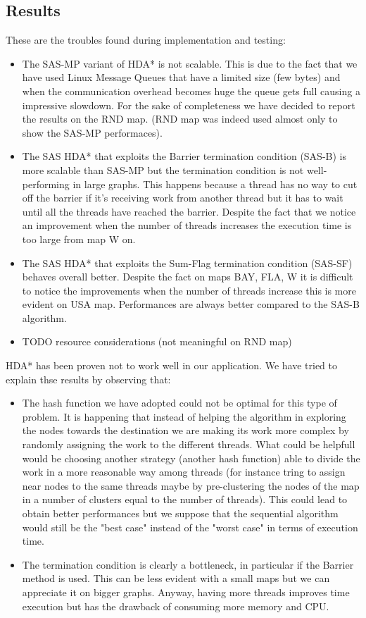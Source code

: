 \documentclass[twocolumn, switch]{article} %
\begin{document}
\subsection{Results}
These are the troubles found during implementation and testing:
\begin{itemize}
  \item The SAS-MP variant of HDA* is not scalable. This is due to the fact that we
        have used Linux Message Queues that have a limited size (few bytes) and when
        the communication overhead becomes huge the queue gets full causing a impressive
        slowdown. For the sake of completeness we have decided to report the results on the
        RND map. (RND map was indeed used almost only to show the SAS-MP performaces).
  \item The SAS HDA* that exploits the Barrier termination condition (SAS-B) is more scalable
        than SAS-MP but the termination condition is not well-performing in large graphs. This 
        happens because a thread has no way to cut off the barrier if it's receiving work from
        another thread but it has to wait until all the threads have reached the barrier. Despite
        the fact that we notice an improvement when the number of threads increases the execution
        time is too large from map W on.
  \item The SAS HDA* that exploits the Sum-Flag termination condition (SAS-SF) behaves overall better.
        Despite the fact on maps BAY, FLA, W it is difficult to notice the improvements when
        the number of threads increase this is more evident on USA map. Performances are always
        better compared to the SAS-B algorithm.
  \item TODO resource considerations (not meaningful on RND map)
\end{itemize}
HDA* has been proven not to work well in our application. We have tried to explain thse 
results by observing that:
\begin{itemize}
  \item The hash function we have adopted could not be optimal for this type of problem. It
        is happening that instead of helping the algorithm in exploring the nodes towards the destination
        we are making its work more complex by randomly assigning the work to the different threads.
        What could be helpfull would be choosing another strategy (another hash function) able to 
        divide the work in a more reasonable way among threads (for instance tring to assign near nodes
        to the same threads maybe by pre-clustering the nodes of the map in a number of clusters
        equal to the number of threads). This could lead to obtain better performances but we
        suppose that the sequential algorithm would still be the "best case" instead of the "worst case"
        in terms of execution time.
  \item The termination condition is clearly a bottleneck, in particular if the Barrier method
        is used. This can be less evident with a small maps but we can appreciate it on bigger graphs.
        Anyway, having more threads improves time execution but has the drawback of consuming more
        memory and CPU.      
\end{itemize}
\end{document}
